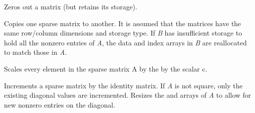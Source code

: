 \documentclass[letterpaper,10pt,english]{sphinxmanual}
\begin{document}

\begin{fulllineitems}
\label{linear_solvers/SLS:c.SlsSetToZero}
Zeros out a {\hyperref[linear_solvers/SLS:c.SlsMat]{\emph{}}} matrix (but retains its storage).

\end{fulllineitems}


\begin{fulllineitems}
\label{linear_solvers/SLS:c.CopySparseMat}
Copies one sparse matrix to another.  It is assumed that the
matrices have the same row/column dimensions and storage type.  If
\emph{B} has insufficient storage to hold all the nonzero entries of
\emph{A}, the data and index arrays in \emph{B} are reallocated to match
those in \emph{A}.

\end{fulllineitems}


\begin{fulllineitems}
\label{linear_solvers/SLS:c.ScaleSparseMat}
Scales every element in the sparse matrix A by the by the
scalar c.

\end{fulllineitems}


\begin{fulllineitems}
\label{linear_solvers/SLS:c.AddIdentitySparseMat}
Increments a sparse matrix by the identity matrix.  If \emph{A} is not
square, only the existing diagonal values are incremented.  Resizes
the  and  arrays of \emph{A} to allow for new nonzero
entries on the diagonal.

\end{fulllineitems}
\end{document}

